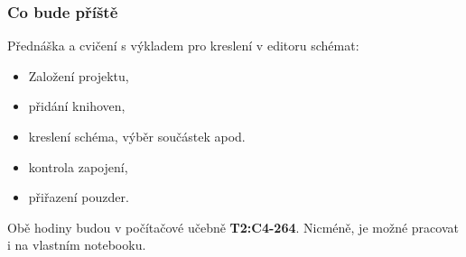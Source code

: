 \documentclass{beamer}
\begin{document}
	\begin{frame}
    \frametitle{Co bude příště}
	
		Přednáška a cvičení s výkladem pro kreslení v editoru schémat:
		\begin{itemize}
			\item Založení projektu,
			\item přidání knihoven,
			\item kreslení schéma, výběr součástek apod.
			\item kontrola zapojení,
			\item přiřazení pouzder.
		\end{itemize}
		Obě hodiny budou v počítačové učebně \textbf{T2:C4-264}. Nicméně, je možné pracovat i na vlastním notebooku. 
	\end{frame}
\end{document}
